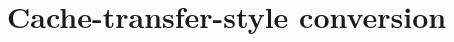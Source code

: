 \chapter{Cache-transfer-style conversion}
\label{ch:cts}
\newcommand{\poplPath}[1]{popl18/#1}






